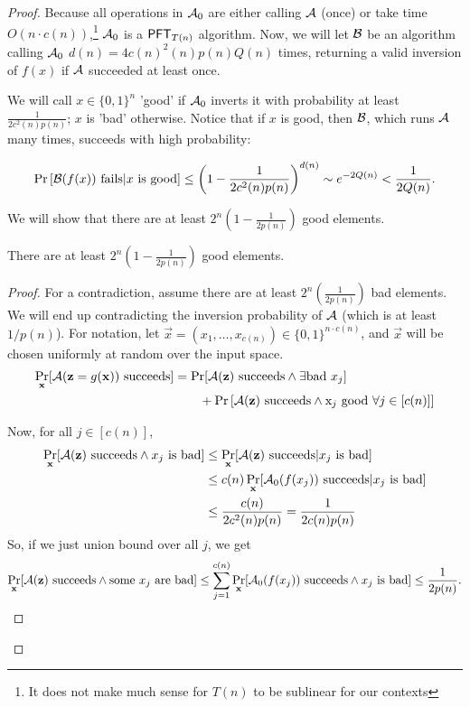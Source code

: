 \begin{proof}
	Because all operations in $\mathcal{A}_0$ are either calling $\mathcal{A}$ (once) or take time $O(n\cdot c(n))$,\footnote{It does not make much sense for $T(n)$ to be sublinear for our contexts} $\mathcal{A}_0$ is a $\mathsf{PFT}_{T(n)}$ algorithm. Now, we will let ${\cal B}$ be an algorithm calling $\mathcal{A}_0$ $d(n) = 4c(n)^2 (n)p(n)Q(n)$ times, returning a valid inversion of $f(x)$ if $\mathcal{A}$ succeeded at least once.
	
	We will call $x \in \{0,1\}^n$ 'good' if $\mathcal{A}_0$ inverts it with probability at least $\frac 1 {2c^2(n)p(n)}$; $x$ is 'bad' otherwise. Notice that if $x$ is good, then ${\cal B}$, which runs $\mathcal{A}$ many times, succeeds with high probability:
	
	\[ \Pr\left[{\cal B}(f(x)) \mbox{ fails} | x\mbox{ is good}\right] \le \left(1 - \frac 1{2c^2(n)p(n)}\right)^{d(n)} \sim e^{-2Q(n)} < \frac 1 {2Q(n)}. \]
	
	
	We will show that there are at least $2^n(1 - \frac{1}{2p(n)})$ good elements.
	
	
	\begin{claim}
		There are at least $2^n(1 - \frac{1}{2p(n)})$ good elements.
	\end{claim}
	\begin{proof}
		For a contradiction, assume there are at least $2^n(\frac{1}{2p(n)})$ bad elements. We will end up contradicting the inversion probability of $\mathcal{A}$ (which is at least $1/p(n)$). For notation, let $\vec x = (x_1, \dots, x_{c(n)}) \in \{0,1\}^{n\cdot c(n)}$, and $\vec x$ will be chosen uniformly at random over the input space.
		\begin{align*}
		\Pr_{\mathbf x}[\mathcal{A}(\mathbf z = g(\mathbf x)) \mbox{ succeeds}] &= \Pr[\mathcal{A}(\mathbf z)\mbox{ succeeds} \land \exists \mbox{bad }x_j]\\
		&\qquad + \Pr\left[\mathcal{A}(\mathbf z)\mbox{ succeeds} \land \mbox x_j \mbox{ good }\forall j \in [c(n)] \right]
		\end{align*}
		
		Now, for all $j \in [c(n)]$,
		\begin{align*}
		\Pr_{\mathbf x}[\mathcal{A}(\mathbf z) \mbox{ succeeds} \land x_j\mbox{ is bad}] &\le \Pr_{\mathbf x}[\mathcal{A}(\mathbf z) \mbox{ succeeds} |  x_j\mbox{ is bad}]\\
		&\le c(n) \Pr_{\mathbf x}[\mathcal{A}_0(f(x_j))\mbox{ succeeds} | x_j\mbox{ is bad}]\\
		&\le \frac{c(n)}{2c^2(n)p(n)} = \frac{1}{2c(n)p(n)}
		\end{align*}
		So, if we just union bound over all $j$, we get
		\[ \Pr_{\mathbf x}[\mathcal{A}(\mathbf z) \mbox{ succeeds} \land \mbox{some } x_j \mbox{ are bad}] \le \sum_{j = 1}^{c(n)} \Pr_{\mathbf x}[\mathcal{A}_0(f(x_j))\mbox{ succeeds} \land x_j\mbox{ is bad}] \le \frac{1}{2p(n)}. \]
		


\end{proof}
\end{proof}
